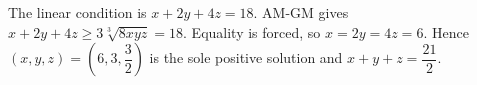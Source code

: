 The linear condition is $x+2y+4z=18$. AM-GM gives $x+2y+4z\ge3\sqrt[3]{8xyz}=18$. Equality is forced, so $x=2y=4z=6$. Hence $(x,y,z)=(6,3,\dfrac{3}{2})$ is the sole positive solution and $\boxed{x+y+z=\dfrac{21}{2}}$.
